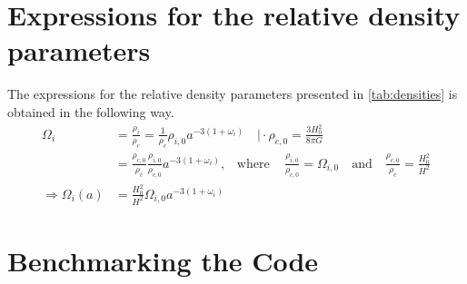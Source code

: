 \documentclass[10pt,a4paper]{article}
\providecommand{\qwhere}
{
    \ensuremath{
    ,\quad \text{where} \quad 
    }
}
\begin{document}
\newpage
\begin{appendices}
\appendix
\section{Expressions for the relative density parameters}
\label{asec:density_params}
The expressions for the relative density parameters presented in \cref{tab:densities} is obtained in the following way.
\begin{align*}
    \Omega_i & = \frac{\rho_i}{\rho_c} = \frac{1}{\rho_c} \rho_{i,0} a^{-3(1+\omega_i)} \quad \bigg\rvert \cdot \rho_{c,0} = \frac{3H_0^2}{8\pi G}
    \\
    & = \frac{\rho_{c,0}}{\rho_c} \frac{\rho_{i,0}}{\rho_{c,0}} a^{-3(1+\omega_i)} \qwhere \frac{\rho_{i,0}}{\rho_{c,0}} = \Omega_{i,0} \quad \text{and} \quad \frac{\rho_{c,0}}{\rho_c} = \frac{H_0^2}{H^2}
    \\
    \Rightarrow \Omega_i (a) & = \frac{H_0^2}{H^2} \Omega_{i,0} a^{-3(1+\omega_i)} 
\end{align*}

\section{Benchmarking the Code}
\label{asec:Benchmarking}


\end{appendices}
\end{document}
